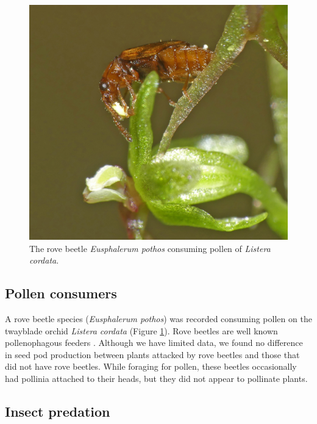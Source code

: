 \begin{multicols}{2}
\begin{figure}[H]
\begin{center}
\vspace{2mm}
\includegraphics[width=\textwidth]{img/Listera_cordata_Eusphalerum_pothos.jpg}
\caption{The rove beetle \emph{Eusphalerum pothos} consuming pollen of \emph{Listera cordata}.}
\label{Listera_cordata_Eusphalerum_pothos}
\end{center}
\end{figure}

\subsection{Pollen consumers}

A rove beetle species (\emph{Eusphalerum pothos}) was recorded consuming
pollen on the twayblade orchid \emph{Listera cordata} (Figure \ref{Listera_cordata_Eusphalerum_pothos}). Rove
beetles are well known pollenophagous feeders \citep{Sayersetal2019}.
Although we have limited data, we found no difference in seed pod
production between plants attacked by rove beetles and those that did
not have rove beetles. While foraging for pollen, these beetles
occasionally had pollinia attached to their heads, but they did not
appear to pollinate plants.

\subsection{Insect predation}


\end{multicols}
